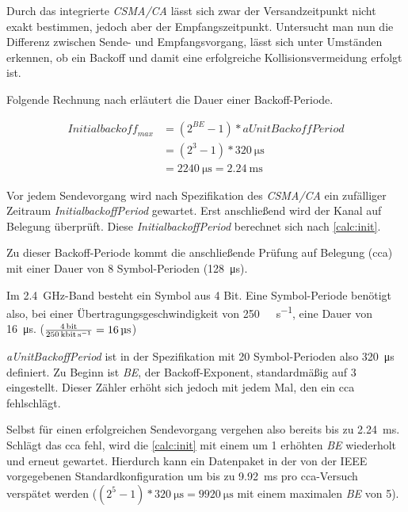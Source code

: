 Durch das integrierte \emph{CSMA/CA} lässt sich zwar der Versandzeitpunkt nicht
exakt bestimmen, jedoch aber der Empfangszeitpunkt. Untersucht man nun die
Differenz zwischen Sende- und Empfangsvorgang, lässt sich unter Umständen
erkennen, ob ein Backoff und damit eine erfolgreiche Kollisionsvermeidung
erfolgt ist.

Folgende Rechnung nach\cite{JENN} erläutert die Dauer einer Backoff-Periode.

\begin{align}\label{calc:init}
\mathit{Initialbackoff}_{max} &=(2^{BE}-1)*\mathit{aUnitBackoffPeriod} \\
&=(2^3-1)*\SI{320}{\micro\second}\nonumber \\
&= \SI{2240}{\micro\second} = \SI{2,24}{\milli\second} \nonumber 
\end{align}

Vor jedem Sendevorgang wird nach Spezifikation des \emph{CSMA/CA} ein zufälliger
Zeitraum \emph{InitialbackoffPeriod} gewartet. Erst anschließend wird der Kanal
auf Belegung überprüft. Diese \emph{InitialbackoffPeriod} berechnet sich nach
\autoref{calc:init}. 

Zu dieser Backoff-Periode kommt die anschließende Prüfung auf Belegung
(\gls{cca}) mit einer Dauer von 8 Symbol-Perioden (\SI{128}{\micro\second}). 

Im \SI{2,4}{\giga\hertz}-Band besteht ein Symbol aus 4 Bit. Eine Symbol-Periode
benötigt also, bei einer Übertragungsgeschwindigkeit von
\SI{250}{\kilo\bit\per\second}, eine Dauer von \SI{16}{\micro\second}.
($\frac{\SI{4}{\bit}}{\SI{250}{\kilo\bit\per\second}}=\SI{16}{\micro\second}$)

\emph{aUnitBackoffPeriod} ist in der Spezifikation mit 20 Symbol-Perioden also
\SI{320}{\micro\second} definiert. Zu Beginn ist \emph{BE}, der
Backoff-Exponent, standardmäßig auf 3 eingestellt. Dieser Zähler erhöht sich
jedoch mit jedem Mal, den ein \gls{cca} fehlschlägt.

Selbst für einen erfolgreichen Sendevorgang vergehen also bereits bis zu
\SI{2,24}{\milli\second}. Schlägt das \gls{cca} fehl, wird die
\autoref{calc:init} mit einem um 1 erhöhten \emph{BE} wiederholt und erneut
gewartet. Hierdurch kann ein Datenpaket in der von der IEEE vorgegebenen
Standardkonfiguration um bis zu \SI{9,92}{\milli\second} pro \gls{cca}-Versuch
verspätet werden ($(2^5-1)*\SI{320}{\micro\second = \SI{9920}{\micro\second}}$
mit einem maximalen \emph{BE} von 5).

